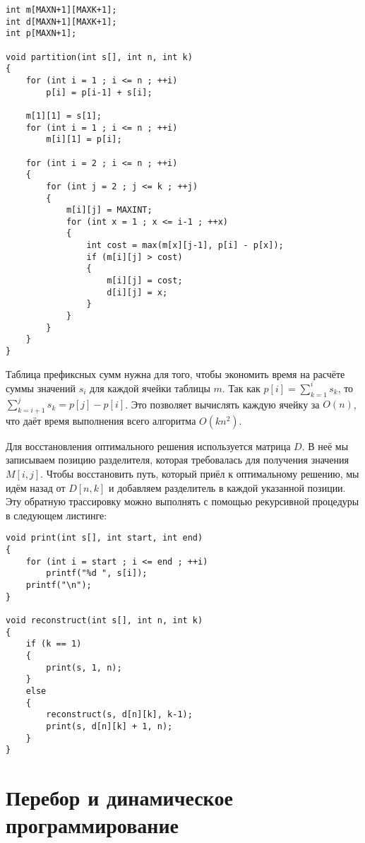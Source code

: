 \documentclass[14pt]{book}
\begin{document}
\begin{lstlisting}
int m[MAXN+1][MAXK+1];
int d[MAXN+1][MAXK+1];
int p[MAXN+1];

void partition(int s[], int n, int k)
{
    for (int i = 1 ; i <= n ; ++i)
        p[i] = p[i-1] + s[i];

    m[1][1] = s[1];
    for (int i = 1 ; i <= n ; ++i)
        m[i][1] = p[i];

    for (int i = 2 ; i <= n ; ++i)
    {
        for (int j = 2 ; j <= k ; ++j)
        {
            m[i][j] = MAXINT;
            for (int x = 1 ; x <= i-1 ; ++x)
            {
                int cost = max(m[x][j-1], p[i] - p[x]);
                if (m[i][j] > cost)
                {
                    m[i][j] = cost;
                    d[i][j] = x;
                }
            }
        }
    }
}
\end{lstlisting}

Таблица префиксных сумм нужна для того, чтобы экономить время на расчёте суммы
значений $s_i$ для каждой ячейки таблицы $m$. Так как $p[i] = \sum_{k=1}^{i}s_k$,
то $\sum_{k=i+1}^{j}s_k = p[j] - p[i]$. Это позволяет вычислять каждую ячейку за
$O(n)$, что даёт время выполнения всего алгоритма $O(kn^2)$.

Для восстановления оптимального решения используется матрица $D$. В неё мы записываем
позицию разделителя, которая требовалась для получения значения $M[i,j]$. Чтобы
восстановить путь, который приёл к оптимальному решению, мы идём назад от $D[n,k]$
и добавляем разделитель в каждой указанной позиции. Эту обратную трассировку можно
выполнять с помощью рекурсивной процедуры в следующем листинге:

\begin{lstlisting}
void print(int s[], int start, int end)
{
    for (int i = start ; i <= end ; ++i)
        printf("%d ", s[i]);
    printf("\n");
}

void reconstruct(int s[], int n, int k)
{
    if (k == 1)
    {
        print(s, 1, n);
    }
    else
    {
        reconstruct(s, d[n][k], k-1);
        print(s, d[n][k] + 1, n);
    }
}
\end{lstlisting}

\chapter{Перебор и динамическое программирование}
\end{document}

